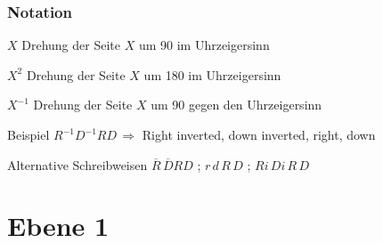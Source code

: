 \begin{frame}
	\frametitle{Notation}
	
	\begin{block}{$X$}
		Drehung der Seite $X$ um 90\gradneu{} im Uhrzeigersinn
	\end{block}
	
	\begin{block}{$X^2$}
		Drehung der Seite $X$ um 180\gradneu{} im Uhrzeigersinn
	\end{block}
	
	\begin{block}{$X^{-1}$}
		Drehung der Seite $X$ um 90\gradneu{} gegen den Uhrzeigersinn
	\end{block}
	
	\begin{exampleblock}{Beispiel}
		$R^{-1}D^{-1}RD \,\Rightarrow$ \glqq Right inverted, down inverted, right, down\grqq
	\end{exampleblock}
	
	\begin{exampleblock}{Alternative Schreibweisen}
		$\overline{R}\,\overline{D}RD$ ; $r\,d\,R\,D$ ; $Ri\,Di\,R\,D$
	\end{exampleblock}
	
\end{frame}



\section{Ebene 1} %
\label{sec:ebene_1}

\subsection*{}

